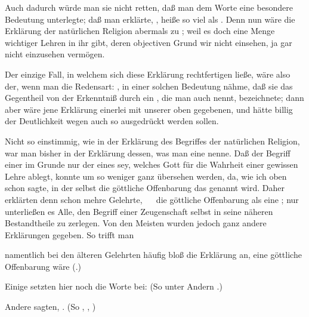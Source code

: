 \begin{aufza}
\begin{aufzb}
\item Auch dadurch würde man sie nicht retten, daß man dem Worte  eine besondere Bedeutung unterlegte; daß man erklärte, , heiße so viel als . Denn nun wäre die Erklärung der natürlichen Religion abermals zu ; weil es doch eine Menge wichtiger Lehren in ihr gibt, deren objectiven Grund wir nicht einsehen, ja gar nicht einzusehen vermögen.
\item Der einzige Fall, in welchem sich diese Erklärung rechtfertigen ließe, wäre also der, wenn man die Redensart: , in einer solchen Bedeutung nähme, daß sie das Gegentheil von der Erkenntniß durch ein , die man auch  nennt, bezeichnete; dann aber wäre jene Erklärung einerlei mit unserer oben gegebenen, und hätte billig der Deutlichkeit wegen auch so ausgedrückt werden sollen.
\end{aufzb}
\item Nicht so einstimmig, wie in der Erklärung des Begriffes der natürlichen Religion, war man bisher in der Erklärung dessen, was man eine  nenne. Daß der Begriff einer  im Grunde nur der eines  sey, welches Gott für die Wahrheit einer gewissen Lehre ablegt, konnte um so weniger ganz übersehen werden, da, wie ich oben schon sagte, in der  selbst die göttliche Offenbarung das  genannt wird. Daher erklärten denn schon mehre Gelehrte, \zB\  \uA\ die göttliche Offenbarung als eine ; nur unterließen es Alle, den Begriff einer Zeugenschaft selbst in seine näheren Bestandtheile zu zerlegen. Von den Meisten wurden jedoch ganz andere Erklärungen gegeben. So trifft man
\begin{aufzb} 
\item namentlich bei den älteren Gelehrten häufig bloß die Erklärung an, eine göttliche Offenbarung wäre  (.)~
\item Einige setzten hier noch die Worte bei:  (So unter Andern .)
\item Andere sagten, . (So , , \uA )

\end{aufzb}
\end{aufza}
